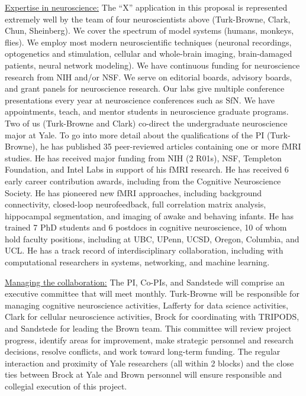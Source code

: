 \vskip4pt \noindent \underline{Expertise in neuroscience:}
The ``X'' application in this proposal is
represented extremely well by the team of four neuroscientists above
(Turk-Browne, Clark, Chun, Sheinberg). We cover the spectrum of model
systems (humans, monkeys, flies). We employ most modern
neuroscientific techniques (neuronal recordings, optogenetics and
stimulation, cellular and whole-brain imaging, brain-damaged patients,
neural network modeling). We have continuous funding for neuroscience
research from NIH and/or NSF. We serve on editorial boards, advisory
boards, and grant panels for neuroscience research. Our labs give
multiple conference presentations every year at neuroscience
conferences such as SfN. We have appointments, teach, and mentor students
in neuroscience graduate programs. Two of us (Turk-Browne and Clark)
co-direct the undergraduate neuroscience major at Yale. To go into
more detail about the qualifications of the PI (Turk-Browne), 
he has published 35 peer-reviewed articles containing one or more fMRI studies. 
He has received major funding from NIH (2 R01s), NSF, Templeton Foundation,
and Intel Labs in support of his fMRI research. He has received 6
early career contribution awards, including from the Cognitive
Neuroscience Society. He has pioneered new fMRI approaches, including
background connectivity, closed-loop neurofeedback, full correlation
matrix analysis, hippocampal segmentation, and imaging of awake and
behaving infants. He has trained 7 PhD students and 6 postdocs in
cognitive neuroscience, 10 of whom hold faculty positions, including
at UBC, UPenn, UCSD, Oregon, Columbia, and UCL. He has a track record of
interdisciplinary collaboration, including with computational
researchers in systems, networking, and machine learning.

\vskip4pt \noindent \underline{Managing the collaboration:} 
The PI, Co-PIs, and Sandstede will
comprise an executive committee that will meet monthly. Turk-Browne
will be responsible for managing cognitive neuroscience activities,
Lafferty for data science activities, Clark for cellular neuroscience
activities, Brock for coordinating with TRIPODS, and Sandstede for
leading the Brown team. This committee will review project progress,
identify areas for improvement, make strategic personnel and research
decisions, resolve conflicts, and work toward long-term funding. The
regular interaction and proximity of Yale researchers (all within 2
blocks) and the close ties between Brock at Yale and Brown personnel
will ensure responsible and collegial execution of this project.

